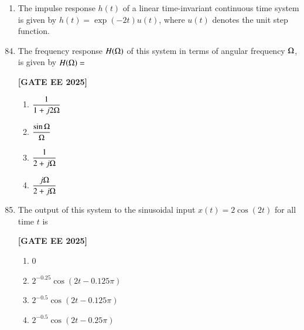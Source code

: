 \documentclass[12pt]{article}
\begin{document}
\begin{enumerate}
\item The impulse response $h(t)$ of a linear time-invariant continuous time system is given by
$h(t) = \exp(-2 t) u(t)$, where $u(t)$ denotes the unit step function.
\end{enumerate}
\begin{enumerate}[leftmargin=*, label=\textbf{Q.\arabic*:}]
\setcounter{enumi}{83}

\item The frequency response $H(\ohm)$ of this system in terms of angular frequency $\ohm$, is given by $H(\ohm) = $
 
\noindent \textbf{[GATE EE 2025]}
\begin{enumerate}
  \item $\dfrac{1}{1 + j2\ohm}$
  \item $\dfrac{\sin \ohm}{\ohm}$
  \item $\dfrac{1}{2 + j\ohm}$
  \item $\dfrac{j\ohm}{2 + j\ohm}$
\end{enumerate}

\item The output of this system to the sinusoidal input $x(t) = 2 \cos (2t)$ for all time $t$ is
 
\noindent \textbf{[GATE EE 2025]}
\begin{enumerate}
  \item $0$
  \item $2^{-0.25} \cos (2t - 0.125\pi)$
  \item $2^{-0.5} \cos (2t - 0.125\pi)$
  \item $2^{-0.5} \cos (2t - 0.25\pi)$
\end{enumerate}

\end{enumerate}
\end{document}
